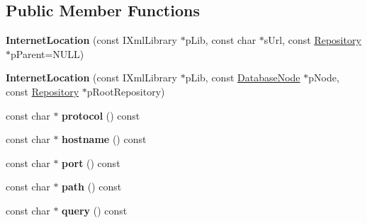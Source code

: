 \subsection*{\-Public \-Member \-Functions}
\begin{DoxyCompactItemize}
\item 
\hypertarget{classgeneral__server_1_1InternetLocation_a82377418e028c1add4b90ce004e6d71a}{{\bfseries \-Internet\-Location} (const \-I\-Xml\-Library $\ast$p\-Lib, const char $\ast$s\-Url, const \hyperlink{classgeneral__server_1_1Repository}{\-Repository} $\ast$p\-Parent=\-N\-U\-L\-L)}\label{classgeneral__server_1_1InternetLocation_a82377418e028c1add4b90ce004e6d71a}

\item 
\hypertarget{classgeneral__server_1_1InternetLocation_af36f08a94778e6a13f1c26e0870193e6}{{\bfseries \-Internet\-Location} (const \-I\-Xml\-Library $\ast$p\-Lib, const \hyperlink{classgeneral__server_1_1DatabaseNode}{\-Database\-Node} $\ast$p\-Node, const \hyperlink{classgeneral__server_1_1Repository}{\-Repository} $\ast$p\-Root\-Repository)}\label{classgeneral__server_1_1InternetLocation_af36f08a94778e6a13f1c26e0870193e6}

\item 
\hypertarget{classgeneral__server_1_1InternetLocation_a0f380456c39951004d16d264c7343c05}{const char $\ast$ {\bfseries protocol} () const }\label{classgeneral__server_1_1InternetLocation_a0f380456c39951004d16d264c7343c05}

\item 
\hypertarget{classgeneral__server_1_1InternetLocation_a0caa2e3f2dd432112bb90e06b9e9d60e}{const char $\ast$ {\bfseries hostname} () const }\label{classgeneral__server_1_1InternetLocation_a0caa2e3f2dd432112bb90e06b9e9d60e}

\item 
\hypertarget{classgeneral__server_1_1InternetLocation_a22e88101454da2e60df46d2bb1687fe0}{const char $\ast$ {\bfseries port} () const }\label{classgeneral__server_1_1InternetLocation_a22e88101454da2e60df46d2bb1687fe0}

\item 
\hypertarget{classgeneral__server_1_1InternetLocation_abca91bba58302d0da7b3da84443542da}{const char $\ast$ {\bfseries path} () const }\label{classgeneral__server_1_1InternetLocation_abca91bba58302d0da7b3da84443542da}

\item 
\hypertarget{classgeneral__server_1_1InternetLocation_a5308a8246d4c8005f5bd7b7f155e7a0d}{const char $\ast$ {\bfseries query} () const }\label{classgeneral__server_1_1InternetLocation_a5308a8246d4c8005f5bd7b7f155e7a0d}


\end{DoxyCompactItemize}
